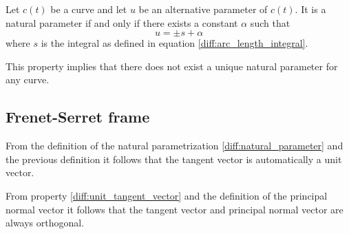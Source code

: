     \begin{property}
        Let $c(t)$ be a curve and let $u$ be an alternative parameter of $c(t)$. It is a natural parameter if and only if there exists a constant $\alpha$ such that \[u = \pm s + \alpha\] where $s$ is the integral as defined in equation \ref{diff:arc_length_integral}.
    \end{property}
    \begin{remark*}
        This property implies that there does not exist a unique natural parameter for any curve.
    \end{remark*}

\subsection{Frenet-Serret frame}

    \begin{property}\label{diff:unit_tangent_vector}
        From the definition of the natural parametrization \ref{diff:natural_parameter} and the previous definition it follows that the tangent vector is automatically a unit vector.
    \end{property}

    \begin{property}
        From property \ref{diff:unit_tangent_vector} and the definition of the principal normal vector it follows that the tangent vector and principal normal vector are always orthogonal.
    \end{property}


